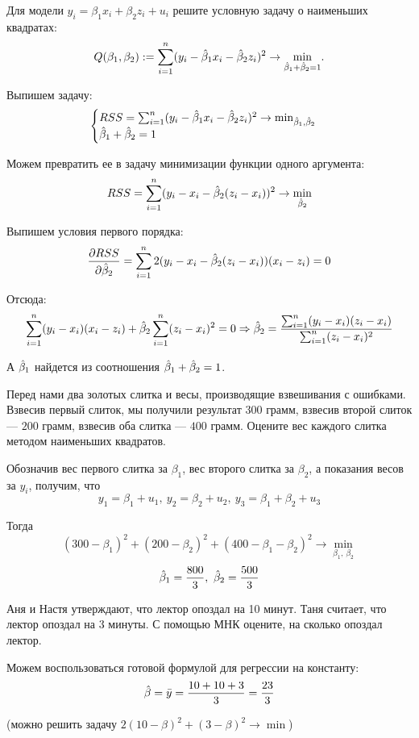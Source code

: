 \begin{problem}
Для модели $y_i = \beta_1 x_i + \beta_2 z_i + u_i$ решите условную задачу о наименьших квадратах:
\[
Q(\beta_1, \beta_2) := \sum_{i=1}^n (y_i - \hat{\beta}_1 x_i - \hat{\beta}_2 z_i)^2 \to \underset{\hat{\beta}_1 + \hat{\beta}_2 = 1}{\min}.
\]


\begin{sol}
Выпишем задачу:
\[
\begin{cases}
RSS = \sum_{i=1}^{n}(y_i - \hat{\beta}_1x_i - \hat{\beta}_2z_i)^2 \to \min_{\hat{\beta}_1, \hat{\beta}_2}\\
\hat{\beta}_1 + \hat{\beta}_2 = 1
\end{cases}
\]

Можем превратить ее в задачу минимизации функции одного аргумента:
\[
RSS =  \sum_{i=1}^{n}(y_i - x_i - \hat{\beta}_2(z_i-x_i))^2 \to \min_{\hat{\beta}_2}
\]

Выпишем условия первого порядка:
\[
\frac{\partial RSS}{\partial \hat{\beta}_2} = \sum_{i=1}^{n}2(y_i-x_i-\hat{\beta}_2(z_i-x_i))(x_i-z_i)=0
\]

Отсюда:
\[
\sum_{i=1}^{n}(y_i-x_i)(x_i-z_i) + \hat{\beta}_2\sum_{i=1}^{n}(z_i-x_i)^2 = 0 \Rightarrow \hat{\beta}_2 = \frac{\sum_{i=1}^n (y_i-x_i)(z_i-x_i)}{\sum_{i=1}^n (z_i-x_i)^2}
\]

А $\hat{\beta}_1$ найдется из соотношения $\hat{\beta}_1+\hat{\beta}_2 = 1$.

\end{sol}
\end{problem}

\begin{problem}
Перед нами два золотых слитка и весы, производящие взвешивания с ошибками. Взвесив первый слиток, мы получили результат $300$ грамм, взвесив второй слиток — $200$ грамм, взвесив оба слитка — $400$ грамм. Оцените вес каждого слитка методом наименьших квадратов.

\begin{sol}
Обозначив вес первого слитка за \(\beta_1\), вес второго слитка за \(\beta_2\), а показания весов за \(y_i\), получим, что
\[y_1 = \beta_1 + u_1, \ y_2 = \beta_2 + u_2, \ y_3 = \beta_1 + \beta_2 + u_3\]

Тогда
\[(300 - \beta_1)^2 + (200 - \beta_2)^2 + (400 - \beta_1 - \beta_2)^2 \to \min _{\beta_1,\  \beta_2} \]
\[\hat{\beta}_1 = \frac{800}{3}, \ \hat{\beta}_2 = \frac{500}{3} \]
\end{sol}
\end{problem}


\begin{problem}
Аня и Настя утверждают, что лектор опоздал на 10 минут. 
Таня считает, что лектор опоздал на 3 минуты. 
С помощью МНК оцените, на сколько опоздал лектор.

\begin{sol}
Можем воспользоваться готовой формулой для регрессии на константу:
\[
\hat{\beta} = \bar{y} = \frac{10+10+3}{3} = \frac{23}{3}
\]

(можно решить задачу $2(10-\beta)^2 + (3-\beta)^2\to \min$)

\end{sol}
\end{problem}

